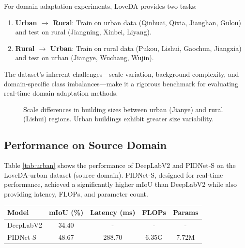 \documentclass{article}
\begin{document}
\begin{multicols}{2}
\begin{figure}[ht]
		\end{figure}  
		
		For domain adaptation experiments, LoveDA provides two tasks:  
		\begin{enumerate}  
			\item \textbf{Urban $\rightarrow$ Rural}: Train on urban data (Qinhuai, Qixia, Jianghan, Gulou) and test on rural (Jiangning, Xinbei, Liyang).  
			\item \textbf{Rural $\rightarrow$ Urban}: Train on rural data (Pukou, Lishui, Gaochun, Jiangxia) and test on urban (Jiangye, Wuchang, Wujin).  
		\end{enumerate}  
		
		The dataset’s inherent challenges—scale variation, background complexity, and domain-specific class imbalances—make it a rigorous benchmark for evaluating real-time domain adaptation methods.  
		
		\begin{figure}[ht]  
			\begin{center} 

			\caption{Scale differences in building sizes between urban (Jianye) and rural (Lishui) regions. Urban buildings exhibit greater size variability.}  
			\label{fig:scale}  
			\end{center} 
		\end{figure}
		\subsection{Performance on Source Domain}
		Table \ref{tab:urban} shows the performance of DeepLabV2 and PIDNet-S on the LoveDA-urban dataset (source domain). PIDNet-S, designed for real-time performance, achieved a significantly higher mIoU than DeepLabV2 while also providing latency, FLOPs, and parameter count.
		\begin{center} 
			\vspace{2cm}
			
			\label{tab:urban}
			
			\tiny
			\begin{tabular}{|l|c|c|c|c|}
				\hline
				Model & mIoU (\%) & Latency (ms) & FLOPs & Params \\ \hline
				DeepLabV2 & 34.40 & - & - & - \\ \hline
				PIDNet-S & 48.67 & 288.70 & 6.35G & 7.72M \\ \hline
			\end{tabular}
				\vspace{0.2cm}
		\end{center} 
		

\end{multicols}
\end{document}
